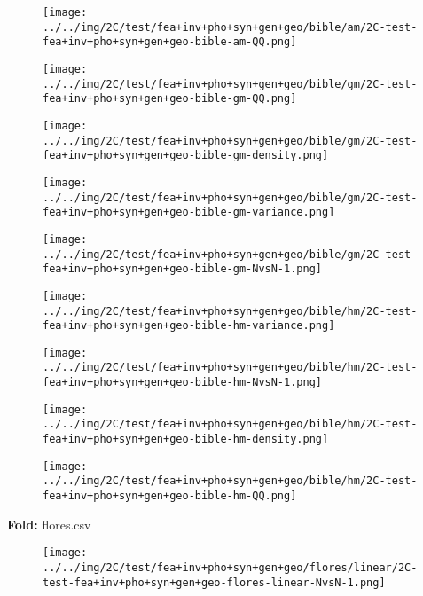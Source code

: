 \begin{figure}[H]
\centering	\texttt{[image: ../../img/2C/test/fea+inv+pho+syn+gen+geo/bible/am/2C-test-fea+inv+pho+syn+gen+geo-bible-am-QQ.png]}
\end{figure}
\begin{figure}[H]
\centering	\texttt{[image: ../../img/2C/test/fea+inv+pho+syn+gen+geo/bible/gm/2C-test-fea+inv+pho+syn+gen+geo-bible-gm-QQ.png]}
\end{figure}
\begin{figure}[H]
\centering	\texttt{[image: ../../img/2C/test/fea+inv+pho+syn+gen+geo/bible/gm/2C-test-fea+inv+pho+syn+gen+geo-bible-gm-density.png]}
\end{figure}
\begin{figure}[H]
\centering	\texttt{[image: ../../img/2C/test/fea+inv+pho+syn+gen+geo/bible/gm/2C-test-fea+inv+pho+syn+gen+geo-bible-gm-variance.png]}
\end{figure}
\begin{figure}[H]
\centering	\texttt{[image: ../../img/2C/test/fea+inv+pho+syn+gen+geo/bible/gm/2C-test-fea+inv+pho+syn+gen+geo-bible-gm-NvsN-1.png]}
\end{figure}
\begin{figure}[H]
\centering	\texttt{[image: ../../img/2C/test/fea+inv+pho+syn+gen+geo/bible/hm/2C-test-fea+inv+pho+syn+gen+geo-bible-hm-variance.png]}
\end{figure}
\begin{figure}[H]
\centering	\texttt{[image: ../../img/2C/test/fea+inv+pho+syn+gen+geo/bible/hm/2C-test-fea+inv+pho+syn+gen+geo-bible-hm-NvsN-1.png]}
\end{figure}
\begin{figure}[H]
\centering	\texttt{[image: ../../img/2C/test/fea+inv+pho+syn+gen+geo/bible/hm/2C-test-fea+inv+pho+syn+gen+geo-bible-hm-density.png]}
\end{figure}
\begin{figure}[H]
\centering	\texttt{[image: ../../img/2C/test/fea+inv+pho+syn+gen+geo/bible/hm/2C-test-fea+inv+pho+syn+gen+geo-bible-hm-QQ.png]}
\end{figure}
\textbf{Fold:} flores.csv
\begin{figure}[H]
\centering	\texttt{[image: ../../img/2C/test/fea+inv+pho+syn+gen+geo/flores/linear/2C-test-fea+inv+pho+syn+gen+geo-flores-linear-NvsN-1.png]}
\end{figure}
